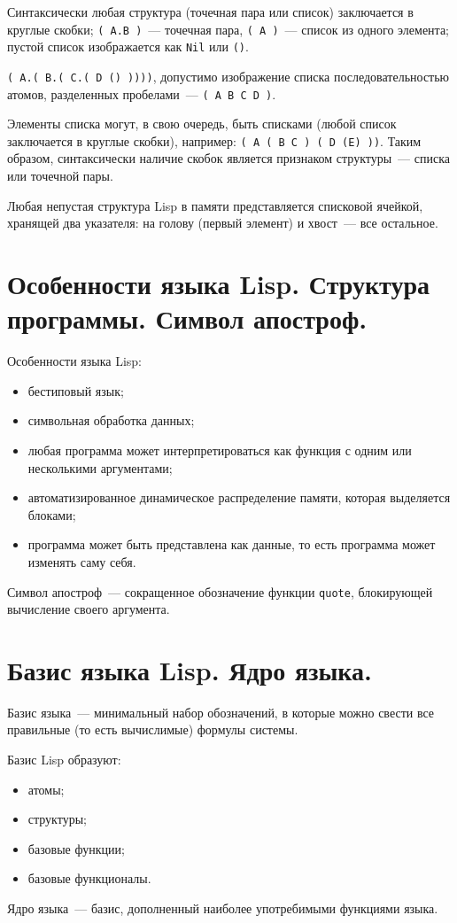 Синтаксически любая структура (точечная пара или список) заключается в круглые скобки; \texttt{( A.B )}~--- точечная пара, \texttt{( A )}~--- список из одного элемента; пустой список изображается как \texttt{Nil} или \texttt{()}.

\texttt{( A.( B.( C.( D () ))))}, допустимо изображение списка последовательностью атомов, разделенных пробелами~--- \texttt{( A B C D )}.

Элементы списка могут, в свою очередь, быть списками (любой список заключается в круглые скобки), например: \texttt{( A ( B C ) ( D (E) ))}.
Таким образом, синтаксически наличие скобок является признаком структуры~--- списка или точечной пары.

Любая непустая структура Lisp в памяти представляется списковой ячейкой, хранящей два указателя: на голову (первый элемент) и хвост~--- все остальное.

\section{Особенности языка Lisp. Структура программы. Символ апостроф.}

Особенности языка Lisp:
\begin{itemize}
	\item бестиповый язык;
	\item символьная обработка данных;
	\item любая программа может интерпретироваться как функция с одним или несколькими аргументами;
	\item автоматизированное динамическое распределение памяти, которая выделяется блоками;
	\item программа может быть представлена как данные, то есть программа может изменять саму себя.
\end{itemize}

Символ апостроф~--- сокращенное обозначение функции \texttt{quote}, блокирующей вычисление своего аргумента.

\section{Базис языка Lisp. Ядро языка.}

Базис языка~--- минимальный набор обозначений, в которые можно свести все правильные (то есть вычислимые) формулы системы.

Базис Lisp образуют:
\begin{itemize}
	\item атомы;
	\item структуры;
	\item базовые функции;
	\item базовые функционалы.
\end{itemize}

Ядро языка~--- базис, дополненный наиболее употребимыми функциями языка.
